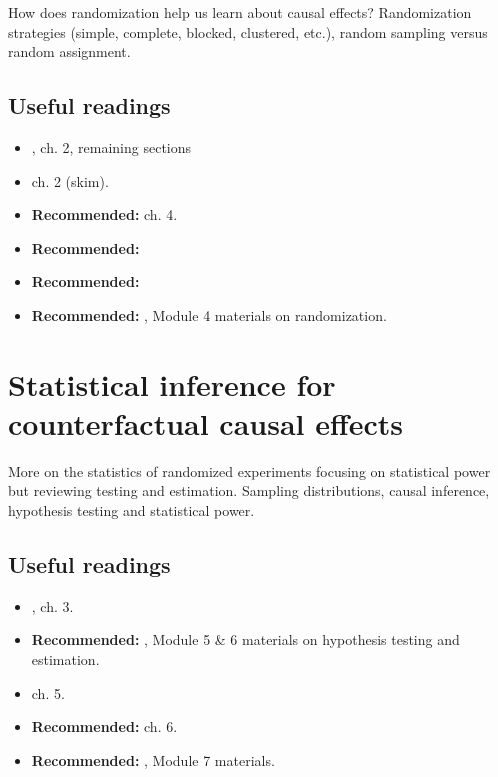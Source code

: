 \documentclass[10pt]{article}
\begin{document}
How does randomization help us learn about causal effects? Randomization
strategies (simple, complete, blocked, clustered, etc.), random sampling versus
random assignment.

\subsection{Useful readings}

\begin{itemize}
    \item {}, ch. 2, remaining sections
    \item {} ch. 2 (skim).
    \item \textbf{Recommended:}   ch. 4.
    \item \textbf{Recommended:} 
    \item \textbf{Recommended:} 
        \item \textbf{Recommended:}
            , Module 4 materials on randomization.
\end{itemize}

\section{Statistical inference for counterfactual causal effects}

More on the statistics of randomized experiments focusing on statistical power
but reviewing testing and estimation. Sampling distributions, causal inference,
hypothesis testing and statistical power.

\subsection{Useful readings}

\begin{itemize}
    \item {}, ch. 3.
    \item \textbf{Recommended:}
        , Module 5 \& 6 materials on hypothesis testing and estimation.
    \item \cite{karlan16} ch. 5.
    \item \textbf{Recommended:}   ch. 6.
    \item \textbf{Recommended:}
        \href{https://egap.github.io/theory_and_practice_of_field_experiments/}{\cite{bowersVoorsIchino2021book}},
        Module 7 materials.
\end{itemize}
\end{document}
